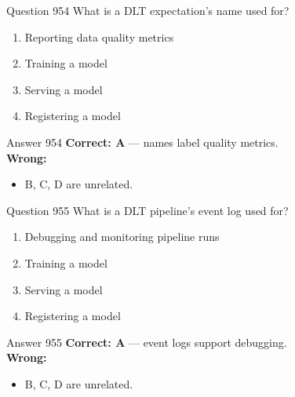 \documentclass[aspectratio=169,11pt]{beamer}
\begin{document}
	\begin{frame}{Question 954}
		What is a DLT expectation's name used for?
		\begin{enumerate}[label=\Alph*.]
			\item Reporting data quality metrics
			\item Training a model
			\item Serving a model
			\item Registering a model
		\end{enumerate}
	\end{frame}
	\begin{frame}{Answer 954}
		\textbf{Correct: A} --- names label quality metrics.\\
		\vspace{0.5em}
		\textbf{Wrong:}
		\begin{itemize}
			\item B, C, D are unrelated.
		\end{itemize}
	\end{frame}
	
	\begin{frame}{Question 955}
		What is a DLT pipeline's event log used for?
		\begin{enumerate}[label=\Alph*.]
			\item Debugging and monitoring pipeline runs
			\item Training a model
			\item Serving a model
			\item Registering a model
		\end{enumerate}
	\end{frame}
	\begin{frame}{Answer 955}
		\textbf{Correct: A} --- event logs support debugging.\\
		\vspace{0.5em}
		\textbf{Wrong:}
		\begin{itemize}
			\item B, C, D are unrelated.
		\end{itemize}
	\end{frame}
	
\end{document}
